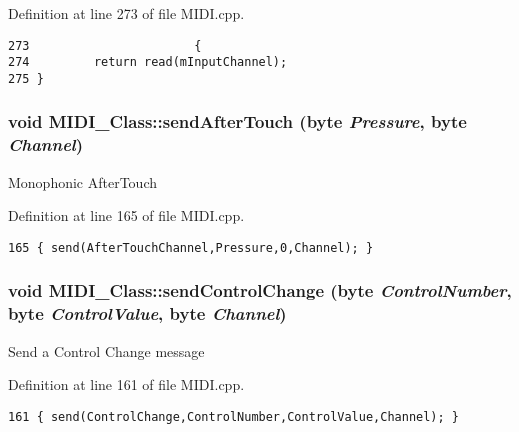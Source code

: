 Definition at line 273 of file MIDI.cpp.

\begin{Code}\begin{verbatim}273                       {
274         return read(mInputChannel);
275 }
\end{verbatim}
\end{Code}


\hypertarget{class_m_i_d_i___class_73b57f656a80166b98dc1b57ea9a56dc}{
\subsubsection[{sendAfterTouch}]{\setlength{\rightskip}{0pt plus 5cm}void MIDI\_\-Class::sendAfterTouch ({\bf byte} {\em Pressure}, \/  {\bf byte} {\em Channel})}}
\label{class_m_i_d_i___class_73b57f656a80166b98dc1b57ea9a56dc}


Monophonic AfterTouch 

Definition at line 165 of file MIDI.cpp.

\begin{Code}\begin{verbatim}165 { send(AfterTouchChannel,Pressure,0,Channel); }
\end{verbatim}
\end{Code}


\hypertarget{class_m_i_d_i___class_3a80e9bd2cfdb619be91d80e8f3b7825}{
\subsubsection[{sendControlChange}]{\setlength{\rightskip}{0pt plus 5cm}void MIDI\_\-Class::sendControlChange ({\bf byte} {\em ControlNumber}, \/  {\bf byte} {\em ControlValue}, \/  {\bf byte} {\em Channel})}}
\label{class_m_i_d_i___class_3a80e9bd2cfdb619be91d80e8f3b7825}


Send a Control Change message 

Definition at line 161 of file MIDI.cpp.

\begin{Code}\begin{verbatim}161 { send(ControlChange,ControlNumber,ControlValue,Channel); }
\end{verbatim}
\end{Code}


